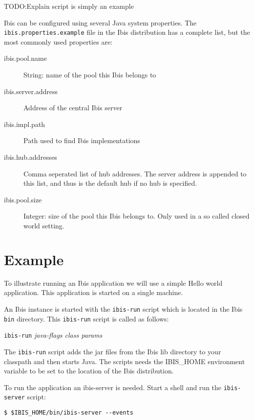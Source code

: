 \documentclass[10pt]{article}
\begin{document}
TODO:Explain script is simply an example

Ibis can be configured using several Java system properties. The
\texttt{ibis.properties.example} file in the Ibis distribution has a complete
list, but the most commonly used properties are:

\begin{description}

\item[ibis.pool.name] String: name of the pool this Ibis belongs to
\item[ibis.server.address] Address of the central Ibis server
\item[ibis.impl.path] Path used to find Ibis implementations
\item[ibis.hub.addresses] Comma seperated list of hub addresses. The
server address is appended to this list, and thus is the default hub if
no hub is specified.
\item[ibis.pool.size] Integer: size of the pool this Ibis belongs to.
Only used in a so called closed world setting.

\end{description}



\section{Example}

To illustrate running an Ibis application we will use a simple Hello
world application. This application is started on a single machine.

An Ibis instance is started with the \texttt{ibis-run} script which
is located in the Ibis \texttt{bin} directory.  This \texttt{ibis-run}
script is called as follows:
\begin{center}
\texttt{ibis-run} \emph{java-flags class params}
\end{center}

The \texttt{ibis-run} script adds the jar files
from the Ibis lib directory to your classpath and then starts Java. The
scripts needs the IBIS\_HOME environment variable to be set to the
location of the Ibis distribution.

To run the application an ibis-server is needed. Start a shell and
run the \texttt{ibis-server} script:
\noindent
{\small
\begin{verbatim}
$ $IBIS_HOME/bin/ibis-server --events
\end{verbatim}
}
\noindent
\end{document}
